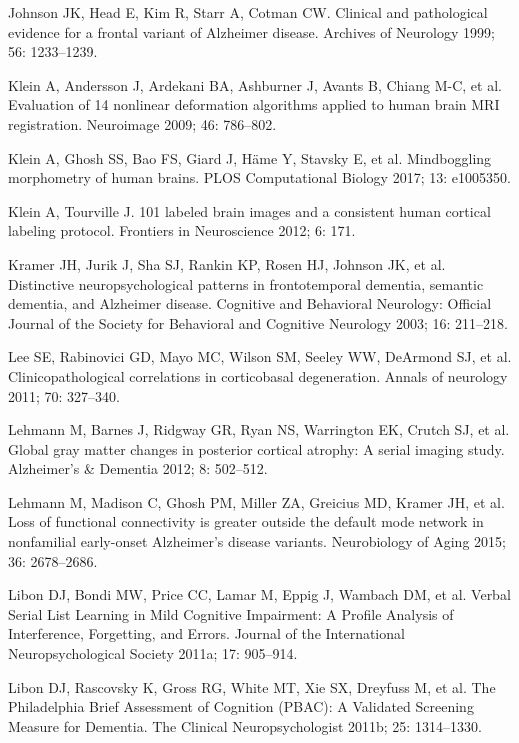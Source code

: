 \documentclass[]{article}
\begin{document}
\hypertarget{ref-johnson_clinical_1999}{}
Johnson JK, Head E, Kim R, Starr A, Cotman CW. Clinical and pathological
evidence for a frontal variant of Alzheimer disease. Archives of
Neurology 1999; 56: 1233--1239.

\hypertarget{ref-klein_evaluation_2009}{}
Klein A, Andersson J, Ardekani BA, Ashburner J, Avants B, Chiang M-C, et
al. Evaluation of 14 nonlinear deformation algorithms applied to human
brain MRI registration. Neuroimage 2009; 46: 786--802.

\hypertarget{ref-klein_mindboggling_2017}{}
Klein A, Ghosh SS, Bao FS, Giard J, Häme Y, Stavsky E, et al.
Mindboggling morphometry of human brains. PLOS Computational Biology
2017; 13: e1005350.

\hypertarget{ref-klein_101_2012}{}
Klein A, Tourville J. 101 labeled brain images and a consistent human
cortical labeling protocol. Frontiers in Neuroscience 2012; 6: 171.

\hypertarget{ref-kramer_distinctive_2003}{}
Kramer JH, Jurik J, Sha SJ, Rankin KP, Rosen HJ, Johnson JK, et al.
Distinctive neuropsychological patterns in frontotemporal dementia,
semantic dementia, and Alzheimer disease. Cognitive and Behavioral
Neurology: Official Journal of the Society for Behavioral and Cognitive
Neurology 2003; 16: 211--218.

\hypertarget{ref-lee_clinicopathological_2011}{}
Lee SE, Rabinovici GD, Mayo MC, Wilson SM, Seeley WW, DeArmond SJ, et
al. Clinicopathological correlations in corticobasal degeneration.
Annals of neurology 2011; 70: 327--340.

\hypertarget{ref-lehmann_global_2012}{}
Lehmann M, Barnes J, Ridgway GR, Ryan NS, Warrington EK, Crutch SJ, et
al. Global gray matter changes in posterior cortical atrophy: A serial
imaging study. Alzheimer's \& Dementia 2012; 8: 502--512.

\hypertarget{ref-lehmann_loss_2015}{}
Lehmann M, Madison C, Ghosh PM, Miller ZA, Greicius MD, Kramer JH, et
al. Loss of functional connectivity is greater outside the default mode
network in nonfamilial early-onset Alzheimer's disease variants.
Neurobiology of Aging 2015; 36: 2678--2686.

\hypertarget{ref-libon_verbal_2011}{}
Libon DJ, Bondi MW, Price CC, Lamar M, Eppig J, Wambach DM, et al.
Verbal Serial List Learning in Mild Cognitive Impairment: A Profile
Analysis of Interference, Forgetting, and Errors. Journal of the
International Neuropsychological Society 2011a; 17: 905--914.

\hypertarget{ref-libon_philadelphia_2011}{}
Libon DJ, Rascovsky K, Gross RG, White MT, Xie SX, Dreyfuss M, et al.
The Philadelphia Brief Assessment of Cognition (PBAC): A Validated
Screening Measure for Dementia. The Clinical Neuropsychologist 2011b;
25: 1314--1330.
\end{document}
